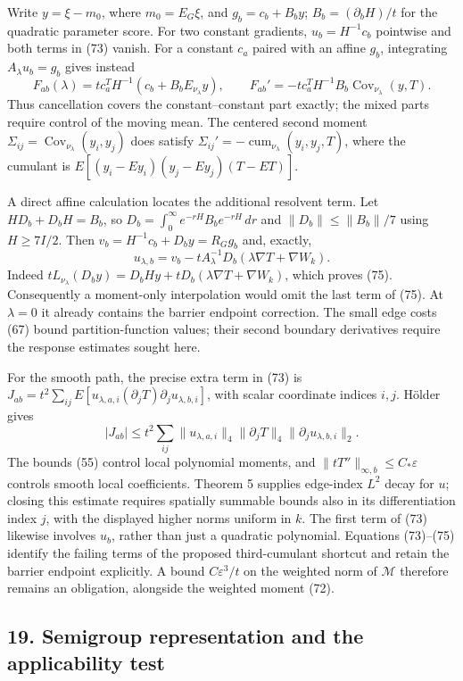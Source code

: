 \documentclass[11pt,a4paper]{article}
\begin{document}
Write \(y=\xi-m_0\), where \(m_0=E_G\xi\), and \(g_b=c_b+B_by\);
\(B_b=(\partial_bH)/t\) for the quadratic parameter score. For two
constant gradients, \(u_b=H^{-1}c_b\) pointwise and both terms in (73)
vanish. For a constant \(c_a\) paired with an affine \(g_b\),
integrating \(A_\lambda u_b=g_b\) gives instead
\[F_{ab}(\lambda)=t c_a^TH^{-1}(c_b+B_bE_{\nu_\lambda}y),\qquad
F_{ab}'=-t c_a^TH^{-1}B_b\operatorname{Cov}_{\nu_\lambda}(y,T).\tag{74}\]
Thus cancellation covers the constant--constant part exactly; the mixed
parts require control of the moving mean. The centered second moment
\(\Sigma_{ij}=\operatorname{Cov}_{\nu_\lambda}(y_i,y_j)\) does satisfy
\(\Sigma_{ij}'=-\operatorname{cum}_{\nu_\lambda}(y_i,y_j,T)\), where the
cumulant is \(E[(y_i-Ey_i)(y_j-Ey_j)(T-ET)]\).

A direct affine calculation locates the additional resolvent term. Let
\(HD_b+D_bH=B_b\), so \(D_b=\int_0^\infty e^{-rH}B_be^{-rH}\,dr\) and
\(\|D_b\|\le\|B_b\|/7\) using \(H\ge7I/2\). Then
\(v_b=H^{-1}c_b+D_by=R_Gg_b\) and, exactly,
\[u_{\lambda,b}=v_b-tA_\lambda^{-1}D_b(\lambda\nabla T+\nabla W_k).
\tag{75}\] Indeed
\(tL_{\nu_\lambda}(D_by)=D_bHy+  tD_b(\lambda\nabla T+\nabla W_k)\),
which proves (75). Consequently a moment-only interpolation would omit
the last term of (75). At \(\lambda=0\) it already contains the barrier
endpoint correction. The small edge costs (67) bound partition-function
values; their second boundary derivatives require the response estimates
sought here.

For the smooth path, the precise extra term in (73) is
\(J_{ab}=t^2\sum_{ij}E[u_{\lambda,a,i}(\partial_jT) \partial_j u_{\lambda,b,i}]\),
with scalar coordinate indices \(i,j\). Hölder gives
\[|J_{ab}|\le t^2\sum_{ij}\|u_{\lambda,a,i}\|_4\|\partial_jT\|_4
\|\partial_j u_{\lambda,b,i}\|_2.\] The bounds (55) control local
polynomial moments, and \(\|tT''\|_{\infty,b}\le C_*\varepsilon\)
controls smooth local coefficients. Theorem 5 supplies edge-index
\(L^2\) decay for \(u\); closing this estimate requires spatially
summable bounds also in its differentiation index \(j\), with the
displayed higher norms uniform in \(k\). The first term of (73) likewise
involves \(u_b\), rather than just a quadratic polynomial. Equations
(73)--(75) identify the failing terms of the proposed third-cumulant
shortcut and retain the barrier endpoint explicitly. A bound
\(C\varepsilon^3/t\) on the weighted norm of \(\mathcal M\) therefore
remains an obligation, alongside the weighted moment (72).

\hypertarget{semigroup-representation-and-the-applicability-test}{%
\subsection{19. Semigroup representation and the applicability
test}\label{semigroup-representation-and-the-applicability-test}}
\end{document}
